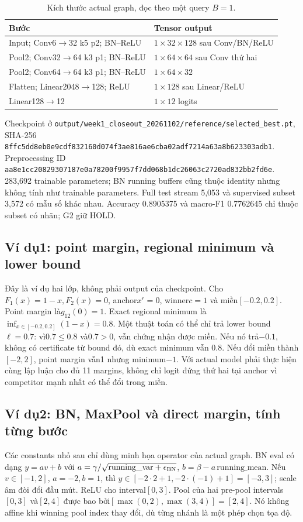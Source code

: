 \documentclass[11pt,a4paper]{article}
\newcommand{\code}[1]{{\small\ttfamily\nolinkurl{#1}}}
\theoremstyle{definition}
\begin{document}
\begin{table}[!htbp]\centering\small
\caption{Kích thước actual graph, đọc theo một query $B=1$.}
\begin{tabularx}{\linewidth}{@{}p{7.2cm}Y@{}}\toprule
Bước & Tensor output\\\midrule
Input; Conv6$\to$32 k5 p2; BN--ReLU & $1\times32\times128$ sau Conv/BN/ReLU\\
Pool2; Conv32$\to$64 k3 p1; BN--ReLU & $1\times64\times64$ sau Conv thứ hai\\
Pool2; Conv64$\to$64 k3 p1; BN--ReLU & $1\times64\times32$\\
Flatten; Linear2048$\to$128; ReLU & $1\times128$ sau Linear/ReLU\\
Linear128$\to$12 & $1\times12$ logits\\\bottomrule
\end{tabularx}
\end{table}
Checkpoint ở \code{output/week1_closeout_20261102/reference/selected_best.pt},
SHA-256 \code{8ffc5dd8eb0e9cdf832160d074f3ae816ae6cba02adf7214a63a8b623303adb1}.
Preprocessing ID \code{aa8e1cc20829307187e0a78200f9957f7dd068b1dc26063c2720ad832bb2fd6e}.
283,692 trainable parameters; BN running buffers cũng thuộc identity nhưng
không tính như trainable parameters. Full test stream 5,053 và supervised
subset 3,572 có mẫu số khác nhau. Accuracy 0.8905375 và macro-F1 0.7762645
chỉ thuộc subset có nhãn; G2 giữ HOLD.

\subsection*{Ví dụ1: point margin, regional minimum và lower bound}
Đây là ví dụ hai lớp, không phải output của checkpoint. Cho
$F_1(x)=1-x,F_2(x)=0$, anchor$x^r=0$, winner$c=1$ và miền$[-0.2,0.2]$.
Point margin là$g_{12}(0)=1$. Exact regional minimum là
$\inf_{x\in[-0.2,0.2]}(1-x)=0.8$. Một thuật toán có thể chỉ trả lower
bound$\ell=0.7$: vì$0.7\le0.8$ và$0.7>0$, vẫn chứng nhận được miền.
Nếu nó trả$-0.1$, không có certificate từ bound đó, dù exact minimum vẫn
$0.8$. Nếu đổi miền thành$[-2,2]$, point margin vẫn1 nhưng minimum$-1$.
Với actual model phải thực hiện cùng lập luận cho đủ 11 margins, không chỉ
logit đứng thứ hai tại anchor vì competitor mạnh nhất có thể đổi trong miền.

\subsection*{Ví dụ2: BN, MaxPool và direct margin, tính từng bước}
Các constants nhỏ sau chỉ dùng minh họa operator của actual graph.
BN eval có dạng $y=a v+b$ với
$a=\gamma/\sqrt{\mathrm{running\_var}+\epsilon_{\rm BN}}$,
$b=\beta-a\,\mathrm{running\_mean}$. Nếu$v\in[-1,2]$, $a=-2,b=1$,
thì $y\in[-2\cdot2+1,-2\cdot(-1)+1]=[-3,3]$; scale âm đòi đổi đầu mút.
ReLU cho interval$[0,3]$. Pool của hai pre-pool intervals$[0,3]$ và$[2,4]$
được bao bởi$[\max(0,2),\max(3,4)]=[2,4]$. Nó không affine khi winning
pool index thay đổi, dù từng nhánh là một phép chọn tọa độ.
\end{document}
